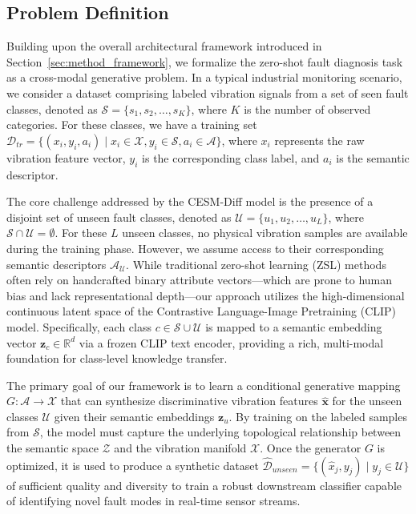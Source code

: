 \subsection{Problem Definition}
\label{sec:method_problem_definition}

Building upon the overall architectural framework introduced in Section~\ref{sec:method_framework}, we formalize the zero-shot fault diagnosis task as a cross-modal generative problem. In a typical industrial monitoring scenario, we consider a dataset comprising labeled vibration signals from a set of seen fault classes, denoted as $\mathcal{S} = \{s_1, s_2, \dots, s_K\}$, where $K$ is the number of observed categories. For these classes, we have a training set $\mathcal{D}_{tr} = \{(x_i, y_i, a_i) \mid x_i \in \mathcal{X}, y_i \in \mathcal{S}, a_i \in \mathcal{A}\}$, where $x_i$ represents the raw vibration feature vector, $y_i$ is the corresponding class label, and $a_i$ is the semantic descriptor.

The core challenge addressed by the CESM-Diff model is the presence of a disjoint set of unseen fault classes, denoted as $\mathcal{U} = \{u_1, u_2, \dots, u_L\}$, where $\mathcal{S} \cap \mathcal{U} = \emptyset$. For these $L$ unseen classes, no physical vibration samples are available during the training phase. However, we assume access to their corresponding semantic descriptors $\mathcal{A}_{\mathcal{U}}$. While traditional zero-shot learning (ZSL) methods often rely on handcrafted binary attribute vectors—which are prone to human bias and lack representational depth—our approach utilizes the high-dimensional continuous latent space of the Contrastive Language-Image Pretraining (CLIP) model. Specifically, each class $c \in \mathcal{S} \cup \mathcal{U}$ is mapped to a semantic embedding vector $\mathbf{z}_c \in \mathbb{R}^d$ via a frozen CLIP text encoder, providing a rich, multi-modal foundation for class-level knowledge transfer.

The primary goal of our framework is to learn a conditional generative mapping $G: \mathcal{A} \to \mathcal{X}$ that can synthesize discriminative vibration features $\hat{\mathbf{x}}$ for the unseen classes $\mathcal{U}$ given their semantic embeddings $\mathbf{z}_u$. By training on the labeled samples from $\mathcal{S}$, the model must capture the underlying topological relationship between the semantic space $\mathcal{Z}$ and the vibration manifold $\mathcal{X}$. Once the generator $G$ is optimized, it is used to produce a synthetic dataset $\hat{\mathcal{D}}_{unseen} = \{(\hat{x}_j, y_j) \mid y_j \in \mathcal{U}\}$ of sufficient quality and diversity to train a robust downstream classifier capable of identifying novel fault modes in real-time sensor streams.
